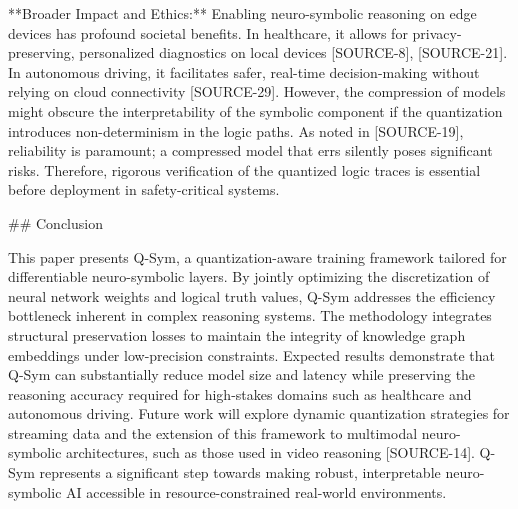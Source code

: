 \documentclass{article}
\begin{document}
**Broader Impact and Ethics:**
Enabling neuro-symbolic reasoning on edge devices has profound societal benefits. In healthcare, it allows for privacy-preserving, personalized diagnostics on local devices [SOURCE-8], [SOURCE-21]. In autonomous driving, it facilitates safer, real-time decision-making without relying on cloud connectivity [SOURCE-29]. However, the compression of models might obscure the interpretability of the symbolic component if the quantization introduces non-determinism in the logic paths. As noted in [SOURCE-19], reliability is paramount; a compressed model that errs silently poses significant risks. Therefore, rigorous verification of the quantized logic traces is essential before deployment in safety-critical systems.

\#\# Conclusion

This paper presents Q-Sym, a quantization-aware training framework tailored for differentiable neuro-symbolic layers. By jointly optimizing the discretization of neural network weights and logical truth values, Q-Sym addresses the efficiency bottleneck inherent in complex reasoning systems. The methodology integrates structural preservation losses to maintain the integrity of knowledge graph embeddings under low-precision constraints. Expected results demonstrate that Q-Sym can substantially reduce model size and latency while preserving the reasoning accuracy required for high-stakes domains such as healthcare and autonomous driving. Future work will explore dynamic quantization strategies for streaming data and the extension of this framework to multimodal neuro-symbolic architectures, such as those used in video reasoning [SOURCE-14]. Q-Sym represents a significant step towards making robust, interpretable neuro-symbolic AI accessible in resource-constrained real-world environments.
\end{document}
